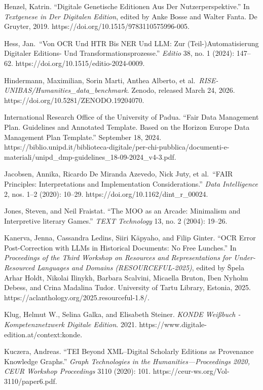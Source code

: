 \documentclass[
  letterpaper,
  DIV=11,
  numbers=noendperiod]{scrreprt}
\begin{document}
Henzel, Katrin. ``Digitale Genetische Editionen Aus Der
Nutzerperspektive.'' In \emph{Textgenese in Der Digitalen Edition},
edited by Anke Bosse and Walter Fanta. De Gruyter, 2019.
https://doi.org/10.1515/9783110575996-005.

Hess, Jan.~``Von OCR Und HTR Bis NER Und LLM: Zur (Teil-)Automatisierung
Digitaler Editions- Und Transformationsprozesse.'' \emph{Editio} 38, no.
1 (2024): 147--62. https://doi.org/10.1515/editio-2024-0009.

Hindermann, Maximilian, Sorin Marti, Anthea Alberto, et
al.~\emph{RISE-UNIBAS/Humanities\_data\_benchmark}. Zenodo, released
March 24, 2026. https://doi.org/10.5281/ZENODO.19204070.

International Research Office of the University of Padua. ``Fair Data
Management Plan. Guidelines and Annotated Template. Based on the Horizon
Europe Data Management Plan Template.'' September 18, 2024.
https://biblio.unipd.it/biblioteca-digitale/per-chi-pubblica/documenti-e-materiali/unipd\_dmp-guidelines\_18-09-2024\_v4-3.pdf.

Jacobsen, Annika, Ricardo De Miranda Azevedo, Nick Juty, et al.~``FAIR
Principles: Interpretations and Implementation Considerations.''
\emph{Data Intelligence} 2, nos. 1--2 (2020): 10--29.
https://doi.org/10.1162/dint\_r\_00024.

Jones, Steven, and Neil Fraistat. ``The MOO as an Arcade: Minimalism and
Interpretive literary Games.'' \emph{TEXT Technology} 13, no. 2 (2004):
19--26.

Kanerva, Jenna, Cassandra Ledins, Siiri Käpyaho, and Filip Ginter. ``OCR
Error Post-Correction with LLMs in Historical Documents: No Free
Lunches.'' In \emph{Proceedings of the Third Workshop on Resources and
Representations for Under-Resourced Languages and Domains
(RESOURCEFUL-2025)}, edited by Špela Arhar Holdt, Nikolai Ilinykh,
Barbara Scalvini, Micaella Bruton, Iben Nyholm Debess, and Crina
Madalina Tudor. University of Tartu Library, Estonia, 2025.
https://aclanthology.org/2025.resourceful-1.8/.

Klug, Helmut W., Selina Galka, and Elisabeth Steiner. \emph{KONDE
Weißbuch - Kompetenznetzwerk Digitale Edition}. 2021.
https://www.digitale-edition.at/context:konde.

Kuczera, Andreas. ``TEI Beyond XML--Digital Scholarly Editions as
Provenance Knowledge Graphs.'' \emph{Graph Technologies in the
Humanities---Proceedings 2020, CEUR Workshop Proceedings} 3110 (2020):
101. https://ceur-ws.org/Vol-3110/paper6.pdf.
\end{document}
